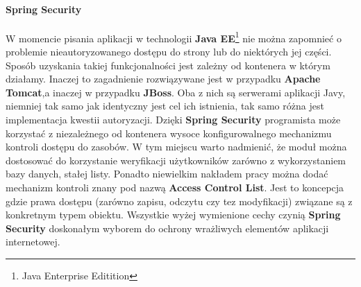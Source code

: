 	\paragraph{Spring Security}	
	W momencie pisania aplikacji w technologii \textbf{Java EE}\footnote{Java Enterprise Editition} nie można zapomnieć o problemie nieautoryzowanego dostępu do strony lub do niektórych jej części. Sposób uzyskania takiej funkcjonalności jest zależny od kontenera w którym działamy. Inaczej to zagadnienie rozwiązywane jest w przypadku \textbf{Apache Tomcat},a inaczej w przypadku \textbf{JBoss}. Oba z nich są serwerami aplikacji Javy, niemniej tak samo jak identyczny jest cel ich istnienia, tak samo różna jest implementacja kwestii autoryzacji. Dzięki \textbf{Spring Security} programista może korzystać z niezależnego od kontenera wysoce konfigurowalnego mechanizmu kontroli dostępu do zasobów. W tym miejscu warto nadmienić, że moduł można dostosować do korzystanie weryfikacji użytkowników zarówno z wykorzystaniem bazy danych, stałej listy. Ponadto niewielkim nakładem pracy można dodać mechanizm kontroli znany pod nazwą \textbf{Access Control List}. Jest to koncepcja gdzie prawa dostępu (zarówno zapisu, odczytu czy tez modyfikacji) związane są z konkretnym typem obiektu. Wszystkie wyżej wymienione cechy czynią \textbf{Spring Security} doskonałym wyborem do ochrony wrażliwych elementów aplikacji internetowej. 

